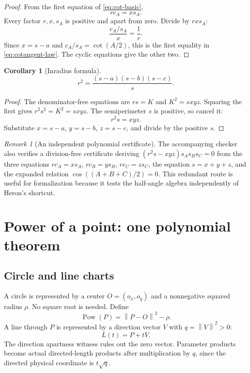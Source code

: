 \documentclass[11pt,letterpaper]{article}
\newtheorem{corollary}[theorem]{Corollary}
\theoremstyle{definition}
\theoremstyle{remark}
\newtheorem{remark}[theorem]{Remark}
\newcommand{\Pow}{\operatorname{Pow}}
\newcommand{\norm}[1]{\left\lVert #1\right\rVert}
\begin{document}
\begin{proof}
From the first equation of \eqref{eq:cot-basic},
\[
 r c_A=x s_A.
\]
Every factor \(r,x,s_A\) is positive and apart from zero.  Divide by
\(rxs_A\):
\[
 \frac{c_A/s_A}{x}=\frac1r.
\]
Since \(x=s-a\) and \(c_A/s_A=\cot(A/2)\), this is the first equality in
\eqref{eq:cotangent-law}.  The cyclic equations give the other two.
\end{proof}

\begin{corollary}[Inradius formula]
\label{cor:inradius}
\[
 r^2=\frac{(s-a)(s-b)(s-c)}s.
 \tag{6.5}\label{eq:inradius-formula}
\]
\end{corollary}

\begin{proof}
The denominator-free equations are \(rs=K\) and \(K^2=sxyz\).  Squaring the
first gives \(r^2s^2=K^2=sxyz\).  The semiperimeter \(s\) is positive, so
cancel it:
\[
 r^2s=xyz.
\]
Substitute \(x=s-a\), \(y=s-b\), \(z=s-c\), and divide by the positive \(s\).
\end{proof}

\begin{remark}[An independent polynomial certificate]
The accompanying checker also verifies a division-free certificate deriving
\((r^2s-xyz)s_As_Bs_C=0\) from the three equations
\(rc_A=xs_A\), \(rc_B=ys_B\), \(rc_C=zs_C\), the equation
\(s=x+y+z\), and the expanded relation
\(\cos((A+B+C)/2)=0\).  This redundant route is useful for formalization
because it tests the half-angle algebra independently of Heron's shortcut.
\end{remark}

\section{Power of a point: one polynomial theorem}
\label{sec:power}

\subsection{Circle and line charts}

A circle is represented by a center \(O=(o_x,o_y)\) and a nonnegative squared
radius \(\rho\).  No square root is needed.  Define
\[
 \Pow(P)=\norm{P-O}^2-\rho.
 \tag{7.1}\label{eq:power-def}
\]
A line through \(P\) is represented by a direction vector \(V\) with
\(q=\norm V^2>0\):
\[
 L(t)=P+tV.
 \tag{7.2}\label{eq:line-chart}
\]
The direction apartness witness rules out the zero vector.  Parameter
products become actual directed-length products after multiplication by
\(q\), since the directed physical coordinate is \(t\sqrt q\).
\end{document}

